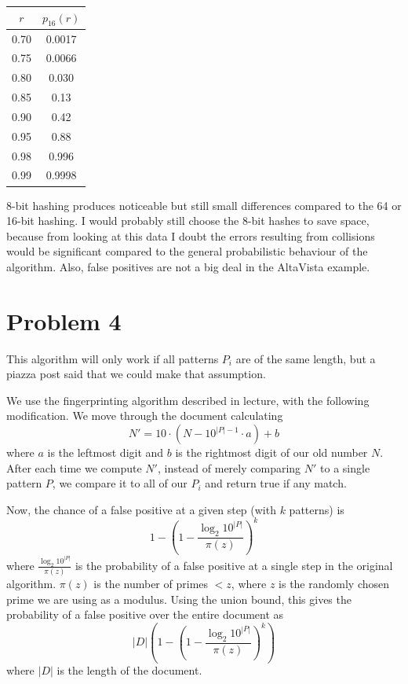 \documentclass{article}
\begin{document}
\begin{center}
\begin{tabular}{ | c | c | }
\hline
$r$ & $p_{16}(r)$ \\
\hline\hline
0.70 & 0.0017 \\
\hline
0.75 & 0.0066\\
\hline
0.80 & 0.030\\
\hline
0.85 & 0.13\\
\hline
0.90 & 0.42\\
\hline
0.95 & 0.88\\
\hline
0.98 & 0.996 \\
\hline
0.99 & 0.9998 \\ 
\hline

\end{tabular}
\end{center}
8-bit hashing produces noticeable but still small differences compared to the 64 or 16-bit hashing. I would probably still choose the 8-bit hashes to save space, because from looking at this data I doubt the errors resulting from collisions would be significant compared to the general probabilistic behaviour of the algorithm.  Also, false positives are not a big deal in the AltaVista example. 

\section*{Problem 4}
This algorithm will only work if all patterns $P_i$ are of the same length, but a piazza post said that we could make that assumption. 

We use the fingerprinting algorithm described in lecture, with the following modification. We move through the document calculating
$$N' = 10 \cdot (N - 10^{|P| - 1} \cdot a) + b$$
where $a$ is the leftmost digit and $b$ is the rightmost digit of our old number $N$. After each time we compute $N'$, instead of merely comparing $N'$ to a single pattern $P$, we compare it to all of our $P_i$ and return true if any match. 

Now, the chance of a false positive at a given step (with $k$ patterns) is
$$1 - (1-\frac{\log_2 10^{|P|}}{\pi(z)})^k$$
where $\frac{\log_2 10^{|P|}}{\pi(z)}$ is the probability of a false positive at a single step in the original algorithm. $\pi(z)$ is the number of primes $< z$, where $z$ is the randomly chosen prime we are using as a modulus. Using the union bound, this gives the probability of a false positive over the entire document as 
$$|D|(1 - (1-\frac{\log_2 10^{|P|}}{\pi(z)})^k)$$
where $|D|$ is the length of the document. 
\end{document}
